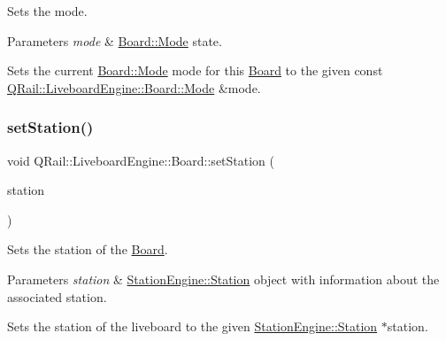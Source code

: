 Sets the mode. 


\begin{DoxyParams}{Parameters}
{\em mode} & \mbox{\hyperlink{classQRail_1_1LiveboardEngine_1_1Board_a0ab6d318f405895f62c6e98cb2d86c6e}{Board\+::\+Mode}} state.\\
\hline
\end{DoxyParams}
Sets the current \mbox{\hyperlink{classQRail_1_1LiveboardEngine_1_1Board_a0ab6d318f405895f62c6e98cb2d86c6e}{Board\+::\+Mode}} mode for this \mbox{\hyperlink{classQRail_1_1LiveboardEngine_1_1Board}{Board}} to the given const \mbox{\hyperlink{classQRail_1_1LiveboardEngine_1_1Board_a0ab6d318f405895f62c6e98cb2d86c6e}{Q\+Rail\+::\+Liveboard\+Engine\+::\+Board\+::\+Mode}} \&mode. \mbox{\label{classQRail_1_1LiveboardEngine_1_1Board_ad54690cca1439296875c9c7c83234bd8}} 
\subsubsection{\texorpdfstring{setStation()}{setStation()}}
{\footnotesize\ttfamily void Q\+Rail\+::\+Liveboard\+Engine\+::\+Board\+::set\+Station (\begin{DoxyParamCaption}\item[{\mbox{\hyperlink{classQRail_1_1StationEngine_1_1Station}{Station\+Engine\+::\+Station}} $\ast$}]{station }\end{DoxyParamCaption})}



Sets the station of the \mbox{\hyperlink{classQRail_1_1LiveboardEngine_1_1Board}{Board}}. 


\begin{DoxyParams}{Parameters}
{\em station} & \mbox{\hyperlink{classQRail_1_1StationEngine_1_1Station}{Station\+Engine\+::\+Station}} object with information about the associated station.\\
\hline
\end{DoxyParams}
Sets the station of the liveboard to the given \mbox{\hyperlink{classQRail_1_1StationEngine_1_1Station}{Station\+Engine\+::\+Station}} $\ast$station. \mbox{\label{classQRail_1_1LiveboardEngine_1_1Board_a1739cf48ec910b5ee0394d30c7ade72b}} 

